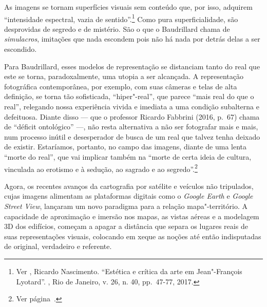 As imagens se tornam superfícies visuais sem conteúdo que, por isso,
adquirem ``intensidade espectral, vazia de sentido''.\footnote{Ver
  , Ricardo Nascimento. ``Estética e crítica da arte em
  Jean"-François Lyotard''. {}, Rio de Janeiro, v. 26, n. 40, pp.~47-77, 2017.}
Como pura superficialidade, são desprovidas de segredo e de mistério.
São o que o Baudrillard chama de \emph{simulacros}, imitações que nada \label{simulacros}
escondem pois não há nada por detrás delas a ser escondido.

Para Baudrillard, esses modelos de representação se distanciam tanto do
real que este se torna, paradoxalmente, uma utopia a ser alcançada. A
representação fotográfica contemporânea, por exemplo, com suas câmeras e
telas de alta definição, se torna tão sofisticada, ``hiper"-real'', que \label{hiperreal}
parece ``mais real do que o real'', relegando nossa experiência vivida e
imediata a uma condição subalterna e defeituosa. Diante disso --- que o
professor Ricardo Fabbrini (2016, p.~67) chama de ``déficit ontológico'' ---, não resta \label{deficit}
alternativa a não ser fotografar mais e mais, num processo inútil e
desesperador de busca de um real que talvez tenha deixado de existir.
Estaríamos, portanto, no campo das imagens, diante de uma lenta ``morte
do real'', que vai implicar também na ``morte de certa ideia de cultura,
vinculada ao erotismo e à sedução, ao sagrado e ao segredo''.\footnote{Ver página~\pageref{compulsiva}.}

Agora, os recentes avanços da cartografia por satélite e veículos não
tripulados, cujas imagens alimentam as plataformas digitais como o
\emph{Google Earth} e \emph{Google Street View}, lançaram um novo
paradigma para a relação mapa"-território. A capacidade de aproximação e
imersão nos mapas, as vistas aéreas e a modelagem 3D dos edifícios,
começam a apagar a distância que separa os lugares reais de suas
representações visuais, colocando em xeque as noções até então
indisputadas de original, verdadeiro e referente.

